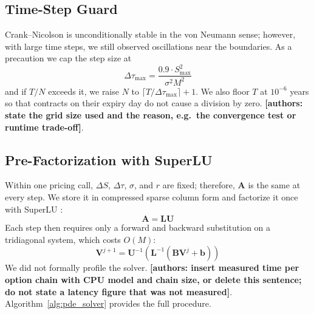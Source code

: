 \documentclass[10pt,journal,compsoc]{IEEEtran}
\newcommand{\fillin}[1]{\textbf{[#1]}}
\begin{document}
\subsection{Time-Step Guard}
Crank--Nicolson is unconditionally stable in the von Neumann sense; however, with large time steps, we still observed oscillations near the boundaries. As a precaution we cap the step size at
\begin{equation}
\Delta \tau_{\max} = \frac{0.9 \cdot S_{\max}^2}{\sigma^2 M^2}
\end{equation}
and if $T/N$ exceeds it, we raise $N$ to $\lceil T / \Delta \tau_{\max} \rceil + 1$. We also floor $T$ at $10^{-6}$ years so that contracts on their expiry day do not cause a division by zero. \fillin{authors: state the grid size used and the reason, e.g.\ the convergence test or runtime trade-off}.

\subsection{Pre-Factorization with SuperLU}
Within one pricing call, $\Delta S$, $\Delta \tau$, $\sigma$, and $r$ are fixed; therefore, $\mathbf{A}$ is the same at every step. We store it in compressed sparse column form and factorize it once with SuperLU \cite{li2005superlu}:
\begin{equation}
\mathbf{A} = \mathbf{L} \mathbf{U}
\end{equation}
Each step then requires only a forward and backward substitution on a tridiagonal system, which costs $O(M)$:
\begin{equation}
\mathbf{V}^{j+1} = \mathbf{U}^{-1} \left(\mathbf{L}^{-1} \left(\mathbf{B} \mathbf{V}^j + \mathbf{b}\right)\right)
\end{equation}
We did not formally profile the solver. \fillin{authors: insert measured time per option chain with CPU model and chain size, or delete this sentence; do not state a latency figure that was not measured}. Algorithm~\ref{alg:pde_solver} provides the full procedure.
\end{document}
